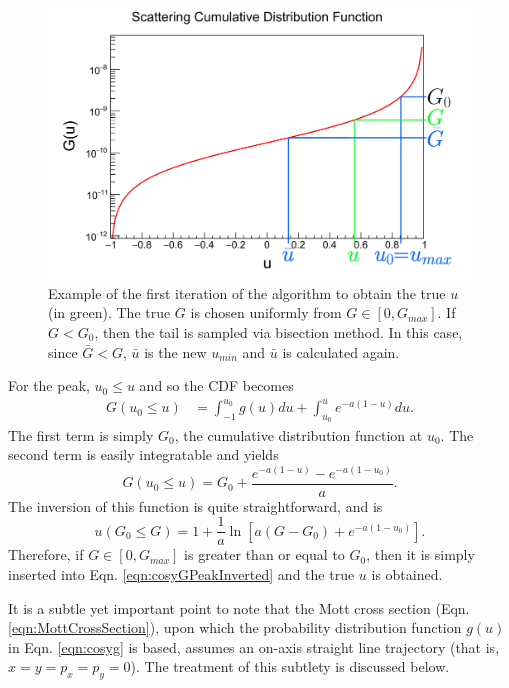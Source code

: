 \begin{figure}
  \centering
    \includegraphics[width=\textwidth]{Figures/scatdist_algorithm} 
  \caption[Example of the first iteration of the COSY CDF algorithm.]{Example of the first iteration of the algorithm to obtain the true $u$ (in green). The true $G$ is chosen uniformly from $G\in[0,G_{max}]$. If $G < G_0$, then the tail is sampled via bisection method. In this case, since $\bar{G} < G$, $\bar{u}$ is the new $u_{min}$ and $\bar{u}$ is calculated again.}
  \label{fig:scatdist_algorithm}
\end{figure}

For the peak, $u_0 \leq u$ and so the CDF becomes
\begin{align*}
G(u_0 \leq u)&=\int_{-1} ^{u_0} g(u) du + \int_{u_0} ^u e^{-a(1-u)} du.
\end{align*}
The first term is simply $G_0$, the cumulative distribution function at $u_0$. The second term is easily integratable and yields
\begin{equation}\label{eqn:cosyGPeak}
G(u_0 \leq u)=G_0 + \frac{e^{-a(1-u)}-e^{-a(1-u_0)}}{a}.
\end{equation}
The inversion of this function is quite straightforward, and is
\begin{equation} \label{eqn:cosyGPeakInverted}
u(G_0 \leq G)=1+\frac{1}{a} \ln \left[a(G-G_0)+e^{-a(1-u_0)}\right].
\end{equation}
Therefore, if $G \in [0,G_{max}]$ is greater than or equal to $G_0$, then it is simply inserted into Eqn. \ref{eqn:cosyGPeakInverted} and the true $u$ is obtained.

It is a subtle yet important point to note that the Mott cross section (Eqn. \ref{eqn:MottCrossSection}), upon which the probability distribution function $g(u)$ in Eqn. \ref{eqn:cosyg} is based, assumes an on-axis straight line trajectory (that is, $x=y=p_x = p_y =0$). The treatment of this subtlety is discussed below.

